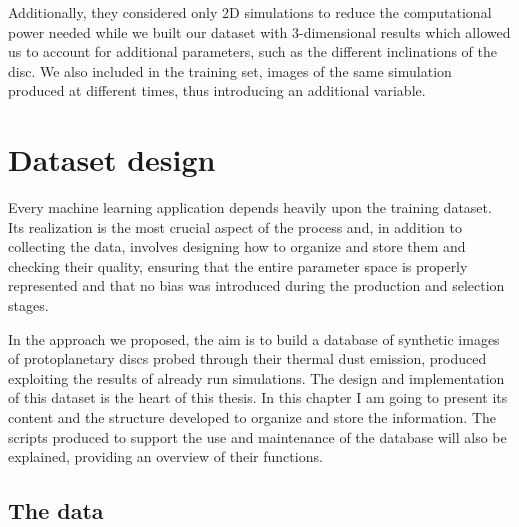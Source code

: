 \documentclass[a4paper,10pt]{report}
\begin{document}
Additionally, they considered only 2D simulations to reduce the computational power needed
while we built our dataset with 3-dimensional results which allowed us to account for additional parameters, such as the different 
inclinations of the disc. We also included in the training set, images of the same simulation
produced at different times, thus introducing an additional variable.

\chapter{Dataset design}

Every machine learning application depends heavily upon the training dataset. 
Its realization is the most crucial aspect of the process and, in addition to collecting the data,
involves designing how to organize and store them and checking their quality, 
ensuring that the entire parameter space is properly represented and that no bias was introduced during
the production and selection stages.

In the approach we proposed, the aim is to build a database of synthetic images of protoplanetary discs
probed through their thermal dust emission, produced exploiting 
the results of already run simulations. The design and implementation of this dataset is the heart of this
thesis. In this chapter I am going to present its content and the structure developed to organize and store the information. 
The scripts produced to support the use and maintenance of the database will also be explained, 
providing an overview of their functions.

\section{The data}

\end{document}
